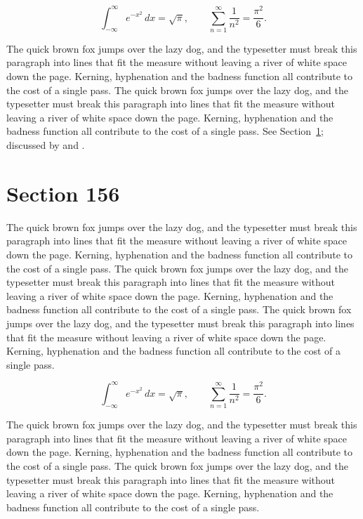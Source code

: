 \documentclass{article}
\begin{document}
\begin{equation}\label{eq:155}
\int_{-\infty}^{\infty} e^{-x^{2}}\,dx = \sqrt{\pi}, \qquad
\sum_{n=1}^{\infty} \frac{1}{n^{2}} = \frac{\pi^{2}}{6}.
\end{equation}

The quick brown fox jumps over the lazy dog, and the typesetter must break this paragraph into lines that fit the measure without leaving a river of white space down the page. Kerning, hyphenation and the badness function all contribute to the cost of a single pass. The quick brown fox jumps over the lazy dog, and the typesetter must break this paragraph into lines that fit the measure without leaving a river of white space down the page. Kerning, hyphenation and the badness function all contribute to the cost of a single pass. 
See Section~\ref{sec:156}; discussed by \textcite{k1} and \textcite{l3}.
\section{Section 156}
\label{sec:156}
The quick brown fox jumps over the lazy dog, and the typesetter must break this paragraph into lines that fit the measure without leaving a river of white space down the page. Kerning, hyphenation and the badness function all contribute to the cost of a single pass. The quick brown fox jumps over the lazy dog, and the typesetter must break this paragraph into lines that fit the measure without leaving a river of white space down the page. Kerning, hyphenation and the badness function all contribute to the cost of a single pass. The quick brown fox jumps over the lazy dog, and the typesetter must break this paragraph into lines that fit the measure without leaving a river of white space down the page. Kerning, hyphenation and the badness function all contribute to the cost of a single pass. 

\begin{equation}\label{eq:156}
\int_{-\infty}^{\infty} e^{-x^{2}}\,dx = \sqrt{\pi}, \qquad
\sum_{n=1}^{\infty} \frac{1}{n^{2}} = \frac{\pi^{2}}{6}.
\end{equation}

The quick brown fox jumps over the lazy dog, and the typesetter must break this paragraph into lines that fit the measure without leaving a river of white space down the page. Kerning, hyphenation and the badness function all contribute to the cost of a single pass. The quick brown fox jumps over the lazy dog, and the typesetter must break this paragraph into lines that fit the measure without leaving a river of white space down the page. Kerning, hyphenation and the badness function all contribute to the cost of a single pass. 
\end{document}
